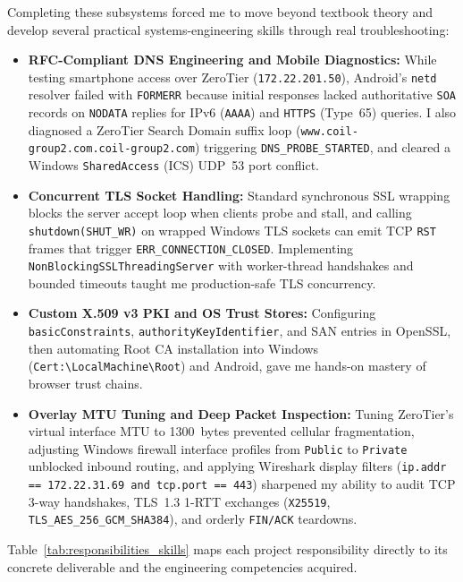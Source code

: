 Completing these subsystems forced me to move beyond textbook theory and develop several practical systems-engineering skills through real troubleshooting:

\begin{itemize}[leftmargin=1.4em, itemsep=4pt]
    \item \textbf{RFC-Compliant DNS Engineering and Mobile Diagnostics:} While testing smartphone access over ZeroTier (\texttt{172.22.201.50}), Android's \texttt{netd} resolver failed with \texttt{FORMERR} because initial responses lacked authoritative \texttt{SOA} records on \texttt{NODATA} replies for IPv6 (\texttt{AAAA}) and \texttt{HTTPS} (Type~65) queries. I also diagnosed a ZeroTier Search Domain suffix loop (\texttt{www.coil-group2.com.coil-group2.com}) triggering \texttt{DNS\_PROBE\_STARTED}, and cleared a Windows \texttt{SharedAccess} (ICS) UDP~53 port conflict.
    \item \textbf{Concurrent TLS Socket Handling:} Standard synchronous SSL wrapping blocks the server accept loop when clients probe and stall, and calling \texttt{shutdown(SHUT\_WR)} on wrapped Windows TLS sockets can emit TCP \texttt{RST} frames that trigger \texttt{ERR\_CONNECTION\_CLOSED}. Implementing \texttt{NonBlockingSSLThreadingServer} with worker-thread handshakes and bounded timeouts taught me production-safe TLS concurrency.
    \item \textbf{Custom X.509 v3 PKI and OS Trust Stores:} Configuring \texttt{basicConstraints}, \texttt{authorityKeyIdentifier}, and SAN entries in OpenSSL, then automating Root CA installation into Windows (\texttt{Cert:\textbackslash LocalMachine\textbackslash Root}) and Android, gave me hands-on mastery of browser trust chains.
    \item \textbf{Overlay MTU Tuning and Deep Packet Inspection:} Tuning ZeroTier's virtual interface MTU to \SI{1300}{bytes} prevented cellular fragmentation, adjusting Windows firewall interface profiles from \texttt{Public} to \texttt{Private} unblocked inbound routing, and applying Wireshark display filters (\texttt{ip.addr == 172.22.31.69 and tcp.port == 443}) sharpened my ability to audit TCP 3-way handshakes, TLS~1.3 1-RTT exchanges (\texttt{X25519}, \texttt{TLS\_AES\_256\_GCM\_SHA384}), and orderly \texttt{FIN/ACK} teardowns.
\end{itemize}

Table~\ref{tab:responsibilities_skills} maps each project responsibility directly to its concrete deliverable and the engineering competencies acquired.

